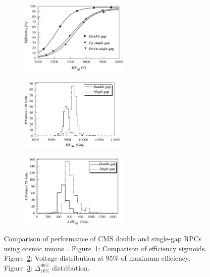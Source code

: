 	\begin{figure}[H]
		\begin{subfigure}{0.33\linewidth}
			\centering
			\hspace*{-0.3\linewidth}
			\includegraphics[height = 3.6cm]{fig/chapt4/Double-gap-Sigmoid.png}
			\caption{\label{fig:DoubleGap:A}}
		\end{subfigure}
		\begin{subfigure}{0.33\linewidth}
			\centering
			\hspace*{-0.1\linewidth}
			\includegraphics[height = 3.6cm]{fig/chapt4/Double-gap-Eff-95.png}
			\caption{\label{fig:DoubleGap:B}}
		\end{subfigure}
		\begin{subfigure}{0.33\linewidth}
			\centering
			\hspace*{0.03\linewidth}
			\includegraphics[height = 3.6cm]{fig/chapt4/Double-gap-Eff-Delta-90-10.png}
			\caption{\label{fig:DoubleGap:C}}
		\end{subfigure}
		\caption{\label{fig:DoubleGap} Comparison of performance of CMS double and single-gap RPCs using cosmic muons~\cite{ABBRESCIA2005}. Figure~\ref{fig:DoubleGap:A}: Comparison of efficiency sigmoids. Figure~\ref{fig:DoubleGap:B}: Voltage distribution at 95\% of maximum efficiency. Figure~\ref{fig:DoubleGap:C}: $\Delta^{90\%}_{10\%}$ distribution.}
	\end{figure}
	
